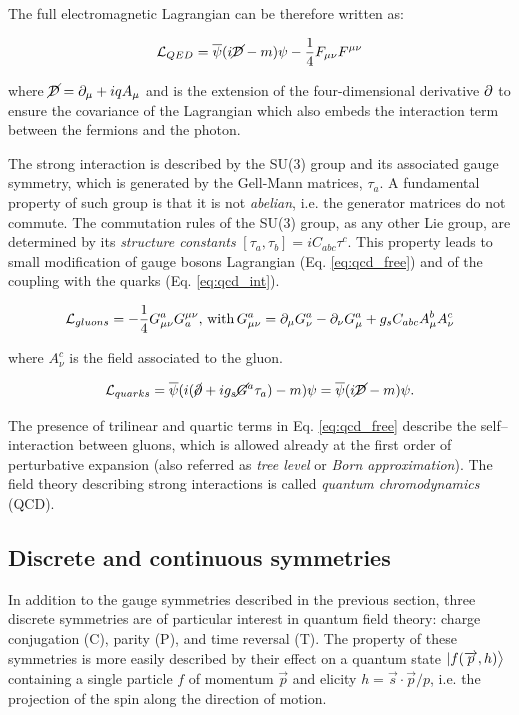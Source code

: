 The full electromagnetic Lagrangian can be therefore written as:

\begin{equation}
\mathcal{L}_{QED} = \overline{\psi}(i\cancel{\mathcal{D}} - m)\psi - \dfrac{1}{4} F_{\mu\nu} F^{\mu\nu}
\end{equation}

where $\cancel{\mathcal{D}} = \partial_\mu + i q A_\mu$ and is the extension of the four-dimensional derivative $\partial$ to ensure the covariance of the Lagrangian which also embeds the interaction term between the fermions and the photon.

The strong interaction is described by the SU(3) group and its associated gauge symmetry, which is generated by the Gell-Mann matrices, $\tau_a$. A fundamental property of such group is that it is not \emph{abelian}, i.e. the generator matrices do not commute. The commutation rules of the SU(3) group, as any other Lie group, are determined by its \emph{structure constants} $[\tau_a, \tau_b] = i C_{abc} \tau^c$. This property leads to small modification of gauge bosons Lagrangian (Eq. \ref{eq:qcd_free}) and of the coupling with the quarks (Eq. \ref{eq:qcd_int}).

\begin{equation}
\mathcal{L}_{gluons} = - \dfrac{1}{4} G^{a}_{\mu\nu}  G_{a}^{\mu\nu}, \, \mathrm{with} \, G^{a}_{\mu\nu} = \partial_\mu G^a_\nu - \partial_\nu G^a_\mu + g_s C_{abc} A^b_\mu A^c_\nu
\label{eq:qcd_free}
\end{equation}

where $A^c_\nu$ is the field associated to the gluon.

\begin{equation}
\mathcal{L}_{quarks} = \overline{\psi} ( i (\cancel{\partial} + i g_s \cancel{G}^a \tau_a) - m ) \psi = \overline{\psi} ( i \cancel{\mathcal{D}} - m ) \psi.
\label{eq:qcd_int}
\end{equation}

The presence of trilinear and quartic terms in Eq. \ref{eq:qcd_free} describe the self--interaction between gluons, which is allowed already at the first order of perturbative expansion (also referred as \emph{tree level} or \emph{Born approximation}). The field theory describing strong interactions is called \emph{quantum chromodynamics} (QCD).

\subsection{Discrete and continuous symmetries}

In addition to the gauge symmetries described in the previous section, three discrete symmetries are of particular interest in quantum field theory: charge conjugation (C), parity (P), and time reversal (T). The property of these symmetries is more easily described by their effect on a quantum state $|f(\overrightarrow{p}, h)\big{>}$ containing a single particle $f$ of momentum $\vec{p}$ and elicity $h = \vec{s} \cdot \vec{p} / p$, i.e. the projection of the spin along the direction of motion.


